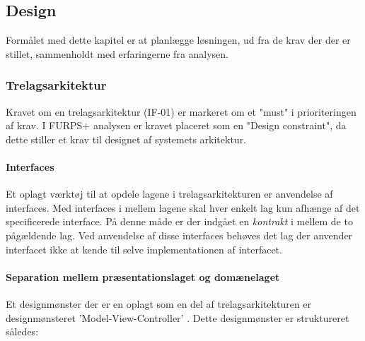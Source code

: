 \newpage
\subsection{Design}

Formålet med dette kapitel er at planlægge løsningen, ud fra de krav der der er
stillet, sammenholdt med erfaringerne fra analysen.


\subsubsection{Trelagsarkitektur}%
\label{ssub:3_lags_arkiteturen}

Kravet om en trelagsarkitektur (IF-01) er markeret om et "must" i prioriteringen af
krav. I FURPS+ analysen er kravet placeret som en "Design constraint", da dette
stiller et krav til designet af systemets arkitektur. 


\paragraph{Interfaces} Et oplagt værktøj til at opdele lagene i
trelagsarkitekturen er anvendelse af interfaces. Med interfaces i mellem lagene 
skal hver enkelt lag kun afhænge af det specificerede interface. På denne måde
er der indgået en \emph{kontrakt} i mellem de to pågældende lag.
Ved anvendelse af disse interfaces behøves det lag der anvender interfacet ikke
at kende til selve implementationen af interfacet.

\paragraph{Separation mellem præsentationslaget og domænelaget}

Et designmønster der er en oplagt som en del af trelagsarkitekturen er
designmønsteret 'Model-View-Controller'\cite[p. 176]{} . Dette designmønster er struktureret
således:

